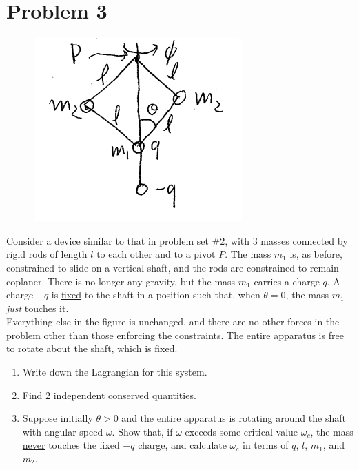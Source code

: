 \documentclass[12pt]{article}
\begin{document}
\section*{Problem 3}
\begin{figure}[H]
    \includegraphics{Problem3}
    \centering
\end{figure}
Consider a device similar to that in problem set \#2, with 3 masses connected by rigid rods of length $l$ to each other and to a pivot $P$. The mass $m_1$ is, as before, constrained to slide on a vertical shaft, and the rods are constrained to remain coplaner. There is no longer any gravity, but the mass $m_1$ carries a charge $q$. A charge $-q$ is \underline{fixed} to the shaft in a position such that, when $\theta = 0$, the mass $m_1$ \textit{just} touches it.\\
Everything else in the figure is unchanged, and there are no other forces in the problem other than those enforcing the constraints. The entire apparatus is free to rotate about the shaft, which is fixed.
\begin{enumerate}[label=(\alph*)]
    \item Write down the Lagrangian for this system.
    \item Find 2 independent conserved quantities.
    \item Suppose initially $\theta > 0$ and the entire apparatus is rotating around the shaft with angular speed $\omega$. Show that, if $\omega$ exceeds some critical value $\omega_c$, the mass \underline{never} touches the fixed $-q$ charge, and calculate $\omega_c$ in terms of $q$, $l$, $m_1$, and $m_2$.
\end{enumerate}
\end{document}
